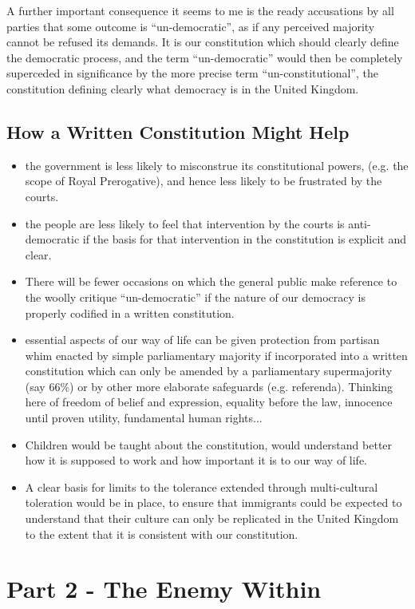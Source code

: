 \documentclass[14pt,titlepage]{extarticle}
\begin{document}
A further important consequence it seems to me is the ready accusations by all parties that some outcome is ``un-democratic'', as if any perceived majority cannot be refused its demands.
It is our constitution which should clearly define the democratic process, and the term ``un-democratic'' would then be completely superceded in significance by the more precise term ``un-constitutional'', the constitution defining clearly what democracy is in the United Kingdom.

\subsection{How a Written Constitution Might Help}

\begin{itemize}
\item the government is less likely to misconstrue its constitutional powers, (e.g. the scope of Royal Prerogative), and hence less likely to be frustrated by the courts.
\item the people are less likely to feel that intervention by the courts is anti-democratic if the basis for that intervention in the constitution is explicit and clear.
\item There will be fewer occasions on which the general public make reference to the woolly critique ``un-democratic'' if the nature of our democracy is properly codified in a written constitution.
\item essential aspects of our way of life can be given protection from partisan whim enacted by simple parliamentary majority if incorporated into a written constitution which can only be amended by a parliamentary supermajority (say 66\%) or by other more elaborate safeguards (e.g. referenda).
  Thinking here of freedom of belief and expression, equality before the law, innocence until proven utility, fundamental human rights...
\item Children would be taught about the constitution, would understand better how it is supposed to work and how important it is to our way of life.
\item A clear basis for limits to the tolerance extended through multi-cultural toleration would be in place, to ensure that immigrants could be expected to understand that their culture can only be replicated in the United Kingdom to the extent that it is consistent with our constitution.
\end{itemize}


\section{Part 2 - The Enemy Within}
\end{document}
